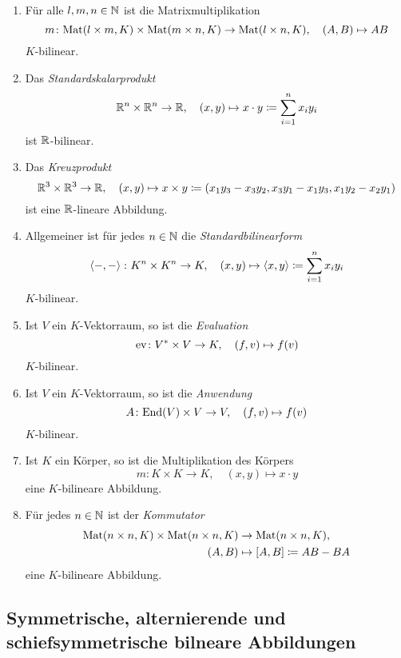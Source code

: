 \begin{bsp}
 \begin{enumerate}[leftmargin=*]
  \item
   Für alle $l,m,n \in \mathbb{N}$ ist die Matrixmultiplikation
   \[
    m \colon \mathrm{Mat}(l \times m, K) \times \mathrm{Mat}(m \times n, K) \to \mathrm{Mat}(l \times n, K), \quad (A,B) \mapsto AB
   \]
   $K$-bilinear.
  \item
   Das \emph{Standardskalarprodukt}
   \[
    \mathbb{R}^n \times \mathbb{R}^n \to \mathbb{R}, \quad (x,y) \mapsto x \cdot y \coloneqq \sum_{i=1}^n x_i y_i
   \]
   ist $\mathbb{R}$-bilinear.
  \item
   Das \emph{Kreuzprodukt}
   \[
    \mathbb{R}^3 \times \mathbb{R}^3 \to \mathbb{R},
    \quad
    (x,y) \mapsto x \times y \coloneqq (x_1 y_3 - x_3 y_2, x_3 y_1 - x_1 y_3, x_1 y_2 - x_2 y_1)
   \]
   ist eine $\mathbb{R}$-lineare Abbildung.
  \item
   Allgemeiner ist für jedes $n \in \mathbb{N}$ die \emph{Standardbilinearform}
   \[
    \left\langle -,- \right\rangle \colon K^n \times K^n \to K, \quad (x,y) \mapsto \left\langle x,y \right\rangle \coloneqq \sum_{i=1}^n x_i y_i
   \]
   $K$-bilinear.
  \item
   Ist $V$ ein $K$-Vektorraum, so ist die \emph{Evaluation}
   \[
    \mathrm{ev} \colon V^* \times V \to K, \quad (f, v) \mapsto f(v)
   \]
   $K$-bilinear.
  \item
   Ist $V$ ein $K$-Vektorraum, so ist die \emph{Anwendung}
   \[
    A \colon \mathrm{End}(V) \times V \to V, \quad (f, v) \mapsto f(v)
   \]
   $K$-bilinear.
  \item
   Ist $K$ ein Körper, so ist die Multiplikation des Körpers
   \[
    m \colon K \times K \to K, \quad (x,y) \mapsto x \cdot y
   \]
   eine $K$-bilineare Abbildung.
  \item
   Für jedes $n \in \mathbb{N}$ ist der \emph{Kommutator}
   \begin{align*}
    \mathrm{Mat}(n \times n, K) \times \mathrm{Mat}(n \times n, K) &\to \mathrm{Mat}(n \times n, K), \\
    (A,B) &\mapsto [A,B] \coloneqq AB-BA
   \end{align*}
   eine $K$-bilineare Abbildung.
 \end{enumerate}
\end{bsp}



\subsection{Symmetrische, alternierende und schiefsymmetrische bilneare Abbildungen}


